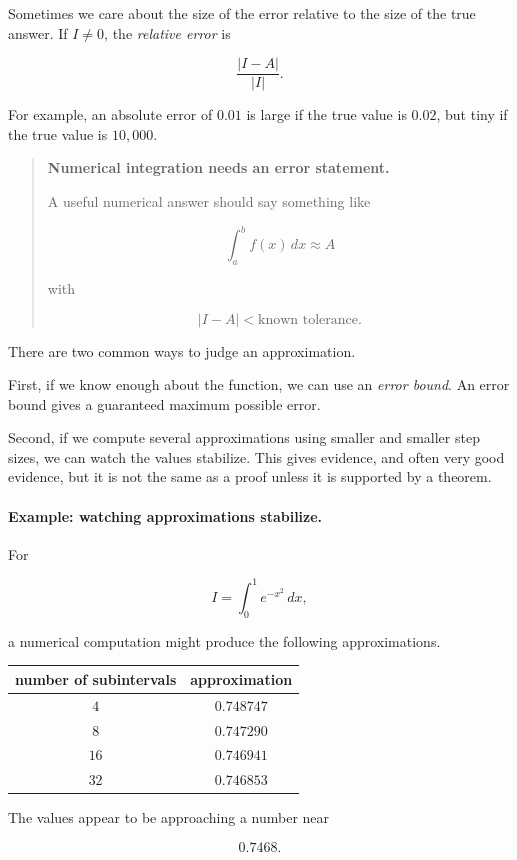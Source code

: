 Sometimes we care about the size of the error relative to the size of the true answer.  If
\(I\neq0\), the \emph{relative error} is

\[
\boxed{
\frac{|I-A|}{|I|}.
}
\]

For example, an absolute error of \(0.01\) is large if the true value is \(0.02\), but tiny if
the true value is \(10{,}000\).

\begin{quote}
\textbf{Numerical integration needs an error statement.}

A useful numerical answer should say something like

\[
\int_a^b f(x)\,dx\approx A
\]

with

\[
|I-A|<\text{known tolerance}.
\]
\end{quote}

There are two common ways to judge an approximation.

First, if we know enough about the function, we can use an \emph{error bound}.  An error
bound gives a guaranteed maximum possible error.

Second, if we compute several approximations using smaller and smaller step sizes, we
can watch the values stabilize.  This gives evidence, and often very good evidence, but it
is not the same as a proof unless it is supported by a theorem.

\paragraph{Example: watching approximations stabilize.}
For

\[
I=\int_0^1 e^{-x^2}\,dx,
\]

a numerical computation might produce the following approximations.

\begin{center}
\begin{tabular}{c|c}
\textbf{number of subintervals} & \textbf{approximation} \\ \hline
\(4\) & \(0.748747\) \\
\(8\) & \(0.747290\) \\
\(16\) & \(0.746941\) \\
\(32\) & \(0.746853\)
\end{tabular}
\end{center}

The values appear to be approaching a number near

\[
0.7468.
\]

